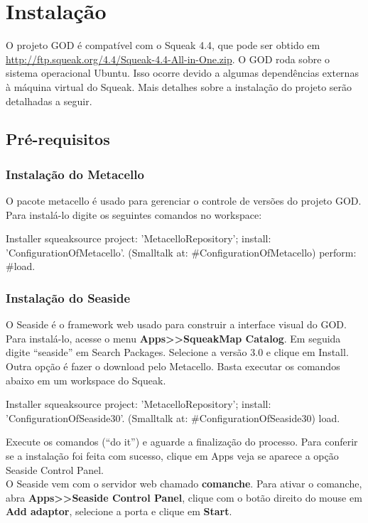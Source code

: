 \section{Instalação}

O projeto GOD é compatível com o Squeak 4.4, que pode ser obtido em \url{http://ftp.squeak.org/4.4/Squeak-4.4-All-in-One.zip}. 
O GOD roda sobre o sistema operacional Ubuntu. Isso ocorre devido a algumas dependências externas à máquina virtual do Squeak. Mais detalhes sobre a instalação do projeto serão detalhadas a seguir.


\subsection{Pré-requisitos}

\subsubsection{Instalação do Metacello}

O pacote metacello é usado para gerenciar o controle de versões do projeto GOD. Para instalá-lo digite os seguintes comandos no workspace:
\begin{godCode}
Installer squeaksource
    project: 'MetacelloRepository';
    install: 'ConfigurationOfMetacello'. 
(Smalltalk at: #ConfigurationOfMetacello) perform: #load.
\end{godCode}

\subsubsection{Instalação do Seaside}

O Seaside é o framework web usado para construir a interface visual do GOD. Para instalá-lo, acesse o menu \textbf{Apps>>SqueakMap Catalog}. Em seguida digite ``seaside'' em Search Packages. Selecione a versão 3.0 e clique em Install.\\
Outra opção é fazer o download pelo Metacello. Basta executar os comandos abaixo em um workspace do Squeak.
\begin{godCode}
Installer squeaksource
 project: 'MetacelloRepository';
 install: 'ConfigurationOfSeaside30'.
 (Smalltalk at: #ConfigurationOfSeaside30) load.
 \end{godCode}
Execute os comandos (``do it'') e aguarde a finalização do processo. Para conferir se a instalação foi feita com sucesso, clique em Apps veja se aparece a opção Seaside Control Panel.\\
O Seaside vem com o servidor web chamado \textbf{comanche}. Para ativar o comanche, abra \textbf{Apps>>Seaside Control Panel}, clique com o botão direito do mouse em \textbf{Add adaptor}, selecione a porta e clique em \textbf{Start}.


